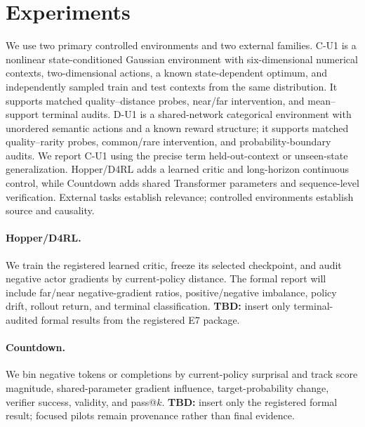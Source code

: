 \section{Experiments}
\label{sec:experiments}

We use two primary controlled environments and two external families. C-U1 is a nonlinear state-conditioned Gaussian environment with six-dimensional numerical contexts, two-dimensional actions, a known state-dependent optimum, and independently sampled train and test contexts from the same distribution. It supports matched quality--distance probes, near/far intervention, and mean--support terminal audits. D-U1 is a shared-network categorical environment with unordered semantic actions and a known reward structure; it supports matched quality--rarity probes, common/rare intervention, and probability-boundary audits. We report C-U1 using the precise term held-out-context or unseen-state generalization. Hopper/D4RL adds a learned critic and long-horizon continuous control, while Countdown adds shared Transformer parameters and sequence-level verification. External tasks establish relevance; controlled environments establish source and causality.



\paragraph{Hopper/D4RL.} We train the registered learned critic, freeze its selected checkpoint, and audit negative actor gradients by current-policy distance. The formal report will include far/near negative-gradient ratios, positive/negative imbalance, policy drift, rollout return, and terminal classification. \textbf{TBD:} insert only terminal-audited formal results from the registered E7 package.

\paragraph{Countdown.} We bin negative tokens or completions by current-policy surprisal and track score magnitude, shared-parameter gradient influence, target-probability change, verifier success, validity, and pass@$k$. \textbf{TBD:} insert only the registered formal result; focused pilots remain provenance rather than final evidence.

